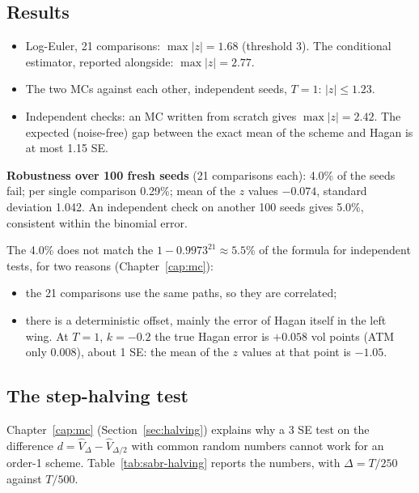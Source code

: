 \subsection{Results}
\begin{progetto}[title={In the qpricer project: the gate on set G}]
\begin{itemize}
\item Log-Euler, 21 comparisons: $\max|z|=1.68$ (threshold 3). The conditional estimator, reported alongside:
$\max|z|=2.77$.
\item The two MCs against each other, independent seeds, $T=1$: $|z|\le1.23$.
\item Independent checks: an MC written from scratch gives $\max|z|=2.42$. The expected (noise-free) gap between the
exact mean of the scheme and Hagan is at most 1.15 SE.
\end{itemize}
\smallskip
\noindent\textbf{Robustness over 100 fresh seeds} (21 comparisons each): 4.0\% of the seeds fail; per single
comparison 0.29\%; mean of the $z$ values $-0.074$, standard deviation 1.042. An independent check on another 100
seeds gives 5.0\%, consistent within the binomial error.
\end{progetto}

The 4.0\% does not match the $1-0.9973^{21}\approx5.5\%$ of the formula for independent tests, for two reasons
(Chapter~\ref{cap:mc}):
\begin{itemize}
\item the 21 comparisons use the same paths, so they are correlated;
\item there is a deterministic offset, mainly the error of Hagan itself in the left wing. At $T=1$, $k=-0.2$ the true
Hagan error is $+0.058$ vol points (ATM only $0.008$), about 1 SE: the mean of the $z$ values at that point is
$-1.05$.
\end{itemize}

\subsection{The step-halving test}
Chapter~\ref{cap:mc} (Section~\ref{sec:halving}) explains why a 3 SE test on the difference
$d=\hat V_\Delta-\hat V_{\Delta/2}$ with common random numbers cannot work for an order-1 scheme.
Table~\ref{tab:sabr-halving} reports the numbers, with $\Delta=T/250$ against $T/500$.

